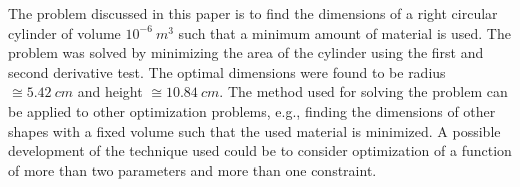 \noindent{}

\bigskip

    \begin{goodexample}
      The problem discussed in this paper is to find the dimensions of
      a right circular cylinder of volume $10^{-6}\ m^3$ such that a
      minimum amount of material is used. The problem was solved by
      minimizing the area of the cylinder using the first and second
      derivative test. The optimal dimensions were found to be radius
      $\cong 5.42\ cm$ and height $\cong 10.84\ cm$. The method used
      for solving the problem can be applied to other optimization
      problems, e.g., finding the dimensions of other shapes with a
      fixed volume such that the used material is minimized. A
      possible development of the technique used could be to consider
      optimization of a function of more than two parameters and more
      than one constraint.
    \end{goodexample}

\noindent{}

